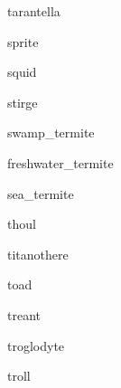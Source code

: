 \documentclass[a4paper,serif]{module}
\begin{document}
\begin{newmonster}{tarantella}\end{newmonster}

\begin{newmonster}{sprite}\end{newmonster}

\begin{newmonster}{squid}\end{newmonster}

\begin{newmonster}{stirge}\end{newmonster}


\begin{newmonster}{swamp_termite}\end{newmonster}

\begin{newmonster}{freshwater_termite}\end{newmonster}

\begin{newmonster}{sea_termite}\end{newmonster}

\begin{newmonster}{thoul}\end{newmonster}

\begin{newmonster}{titanothere}\end{newmonster}

\begin{newmonster}{toad}\end{newmonster}

\begin{newmonster}{treant}\end{newmonster}

\begin{newmonster}{troglodyte}\end{newmonster}

\begin{newmonster}{troll}\end{newmonster}
\end{document}
